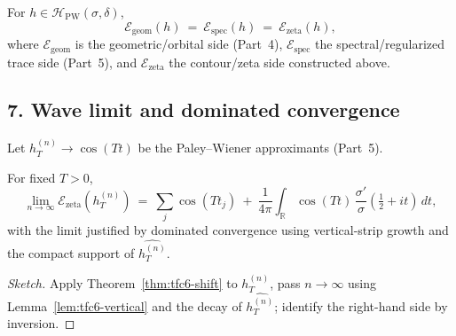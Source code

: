\begin{corollary}\relax\hspace{0pt}
\label{cor:tfc6-E123}\relax\hspace{0pt}
For $h\in\mathcal{H}_{\mathrm{PW}}(\sigma,\delta)$,
\[
\mathcal{E}_{\mathrm{geom}}(h)\ =\ \mathcal{E}_{\mathrm{spec}}(h)\ =\ \mathcal{E}_{\mathrm{zeta}}(h),
\]
where $\mathcal{E}_{\mathrm{geom}}$ is the geometric/orbital side (Part~4), $\mathcal{E}_{\mathrm{spec}}$ the spectral/regularized trace side (Part~5), and $\mathcal{E}_{\mathrm{zeta}}$ the contour/zeta side constructed above. \relax\hspace{0pt}
\end{corollary}

\subsection*{7. Wave limit and dominated convergence}\relax\hspace{0pt}
\label{subsec:tfc6-wave} %

Let $h_T^{(n)}\to \cos(Tt)$ be the Paley--Wiener approximants (Part~5). \relax\hspace{0pt}
\begin{proposition}\relax\hspace{0pt}
\label{prop:tfc6-wave}\relax\hspace{0pt}
For fixed $T>0$,
\[
\lim_{n\to\infty}\mathcal{E}_{\mathrm{zeta}}(h_T^{(n)})\ =\ \sum_j \cos(T t_j)\ +\ \frac{1}{4\pi}\int_{\mathbb{R}} \cos(T t)\,\frac{\sigma'}{\sigma}\!\left(\tfrac12+it\right)\,dt,
\]
with the limit justified by dominated convergence using vertical-strip growth and the compact support of $\widehat{h_T^{(n)}}$. \relax\hspace{0pt}
\end{proposition}

\begin{proof}[Sketch]\relax\hspace{0pt}
Apply Theorem~\ref{thm:tfc6-shift} to $h_T^{(n)}$, pass $n\to\infty$ using Lemma~\ref{lem:tfc6-vertical} and the decay of $\widehat{h_T^{(n)}}$; identify the right-hand side by inversion. \relax\hspace{0pt}
\end{proof}

